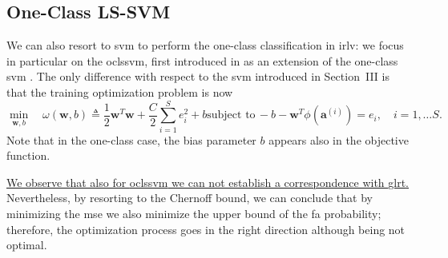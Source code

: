 \documentclass[final,twocolumn]{IEEEtran}
\begin{document}
\subsection{One-Class LS-SVM}

We can also resort to \ac{svm} to perform the one-class classification in \ac{irlv}: we focus in particular on the  \ac{oclssvm}, first introduced in \cite{choi2009} as an extension of the one-class \ac{svm} \cite{Scholkopf2001estimating}. 
The only difference with respect to the \ac{svm} introduced in Section~III is that the training optimization problem is now
\begin{subequations}
	\label{eq:oneClassSvm}
	\begin{equation}
	\label{eq:oneClass1}
	\underset{\bm{w},b}{\min} \quad \omega(\bm{w}, b) \triangleq
	 \frac{1}{2} \bm{w}^T \bm{w} +  \frac{C}{2} \sum_{i=1}^S e_i^2 +b
	\end{equation}
	\begin{equation}
	\label{eq:oneClassConstr}
	\text{subject to}\, -b - \bm{w}^T \phi (\bm{a}^{(i)})  = e_i,  \quad i = 1,\dots S.
	\end{equation}
\end{subequations}
Note that in the one-class case, the bias parameter $b$ appears also in the objective function.


\uline{We observe that also for \ac{oclssvm} we can not establish a correspondence with \ac{glrt}.} Nevertheless, by resorting to the Chernoff bound, we can conclude that by minimizing the \ac{mse} we also minimize the upper bound of the \ac{fa} probability; therefore, the optimization process goes in the right direction although being not optimal.
\end{document}
